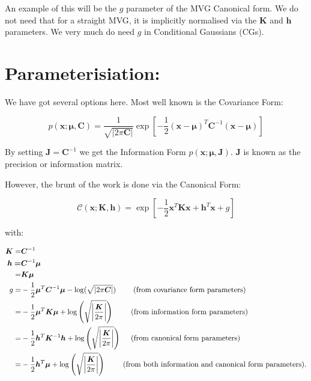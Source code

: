 \documentclass[oneside,english]{scrbook}
\begin{document}
An example of this will be the $g$ parameter of the MVG Canonical
form. We do not need that for a straight MVG, it is implicitly
normalised via the $\bm{K}$ and $\bm{h}$ parameters. We very much do
need $g$ in Conditional Gaussians (CGs).

\section{Parameterisiation:}
We have got several options here. Most well known is the Covariance Form:

\begin{equation}
p(\bm{x;\bm{\mu},\bm{C}})=\frac{1}{\sqrt{|2\pi \bm{C}|}}\exp\left[-\frac{1}{2}(\bm{x}-\bm{\mu})^{T}\bm{C}^{-1}(\bm{x}-\bm{\mu})\right]
\end{equation}

By setting $\bm{J} = \bm{C}^{-1}$ we get the Information Form
$p(\bm{x;\bm{\mu},\bm{J}})$. $\bm{J}$ is known as the
precision or information matrix.

However, the brunt of the work is done via the Canonical Form:

\begin{equation}
\mathcal{C}(\bm{x};\bm{K},\bm{h})=\exp\left[-\frac{1}{2}\bm{x}^{T}\bm{K}\bm{x}+\bm{h}^{T}\bm{x}+g\right]
\end{equation}

with:

\begin{align*}
\bm{K}= & \bm{C}^{-1}\\
\bm{h=} & \bm{C}^{-1}\bm{\mu}\\
= & \bm{K}\bm{\mu}\\
g= & -\frac{1}{2}\bm{\mu}^{T}\bm{C}^{-1}\bm{\mu}-\log(\sqrt{|2\pi \bm{C}|})\text{ \hspace{1em}\hspace{1em}(from covariance form parameters)}\\
= & -\frac{1}{2}\bm{\mu}^{T}\bm{K}\bm{\mu}+\log\left(\sqrt{\left|\frac{\bm{K}}{2\pi}\right|}\right)\text{ \hspace{1em}\hspace{1em}(from information form parameters)}\\
= & -\frac{1}{2}\bm{h}^{T}\bm{K}^{-1}\bm{h}+\log\left(\sqrt{\left|\frac{\bm{K}}{2\pi}\right|}\right)\text{ \hspace{1em}(from canonical form parameters)}\\
= & -\frac{1}{2}\bm{h}^{T}\bm{\mu}+\log\left(\sqrt{\left|\frac{\bm{K}}{2\pi}\right|}\right)\text{ \hspace{1em}\hspace{1em}(from both information and canonical form parameters)}.
\end{align*}
\end{document}
